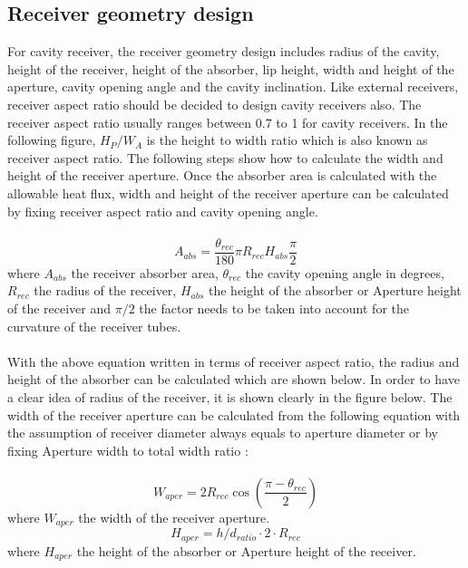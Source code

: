 \subsection{Receiver geometry design}
For cavity receiver, the receiver geometry design includes radius of the cavity, height of the receiver, height of the absorber, lip height, width and height of the aperture, cavity opening angle and the cavity inclination. Like external receivers, receiver aspect ratio should be decided to design cavity receivers also. The receiver aspect ratio usually ranges between 0.7 to 1 for cavity receivers. In the following figure, ${H_P}/{W_A}$ is the height to width ratio which is also known as receiver aspect ratio. The following steps show how to calculate the width and height of the receiver aperture. Once the absorber area is calculated with the allowable heat flux, width and height of the receiver aperture can be calculated by fixing receiver aspect ratio and cavity opening angle. \\\\
\begin{equation}
	A_{abs} = \frac {\theta_{rec}}{180} \pi R_{rec} H_{abs}\frac {\pi}{2}
\end{equation}
where $A_{abs}$ the receiver absorber area, $\theta_{rec}$ the cavity opening angle in degrees, $R_{rec}$ the radius of the receiver, $H_{abs}$ the height of the absorber or Aperture height of the receiver and $\pi / 2$ the factor needs to be taken into account for the curvature of the receiver tubes.\\\\
With the above equation written in terms of receiver aspect ratio, the radius and height of the absorber can be calculated which are shown below. In order to have a clear idea of radius of the receiver, it is shown clearly in the figure below. The width of the receiver aperture can be calculated from the following equation with the assumption of receiver diameter always equals to aperture diameter or by fixing Aperture width to total width ratio :\\\\
\begin{equation}
	W_{aper} = 2 R_{rec} \cos \left( \frac{\pi - \theta_{rec}}{2} \right)
\end{equation}
where $W_{aper}$ the width of the receiver aperture.
\begin{equation}
	H_{aper} = h/d_{ratio} \cdot 2 \cdot R_{rec}
\end{equation}
where $H_{aper}$ the height of the absorber or Aperture height of the receiver.
